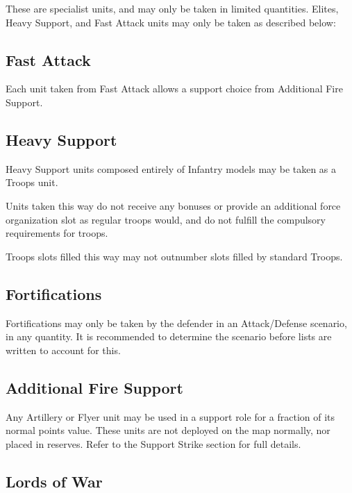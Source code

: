 \documentclass[letterpaper,twocolumn,oneside,titlepage]{book}
\begin{document}
These are specialist units, and may only be taken in limited quantities.
Elites, Heavy Support, and Fast Attack units may only be taken as
described below:

\subsection{\texorpdfstring{\textbf{Fast
Attack}}{Fast Attack}}\label{fast-attack}

Each unit taken from Fast Attack allows a support choice from Additional
Fire Support.

\subsection{\texorpdfstring{\textbf{Heavy
Support}}{Heavy Support}}\label{heavy-support}

Heavy Support units composed entirely of Infantry models may be taken as
a Troops unit.

Units taken this way do not receive any bonuses or provide an additional
force organization slot as regular troops would, and do not fulfill the
compulsory requirements for troops.

Troops slots filled this way may not outnumber slots filled by standard
Troops.

\subsection{\texorpdfstring{\textbf{Fortifications}}{Fortifications}}\label{fortifications}

Fortifications may only be taken by the defender in an Attack/Defense
scenario, in any quantity. It is recommended to determine the scenario
before lists are written to account for this.

\subsection{\texorpdfstring{\textbf{Additional Fire
Support}}{Additional Fire Support}}\label{additional-fire-support}

Any Artillery or Flyer unit may be used in a support role for a fraction
of its normal points value. These units are not deployed on the map
normally, nor placed in reserves. Refer to the Support Strike section
for full details.

\subsection{\texorpdfstring{\textbf{Lords of
War}}{Lords of War}}\label{lords-of-war}
\end{document}
